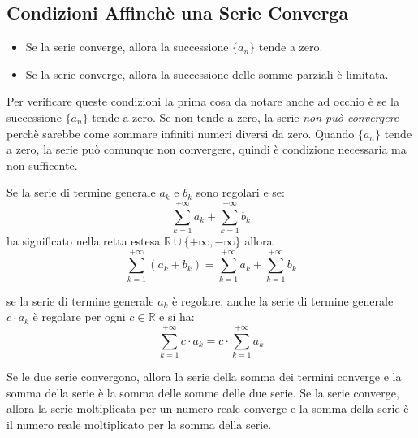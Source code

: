     \subsection{Condizioni Affinchè una Serie Converga}
    \begin{itemize}
        \item Se la serie converge, allora la successione $\{a_n\}$ tende a zero.
        \item Se la serie converge, allora la successione delle somme parziali è limitata.
    \end{itemize}
    Per verificare queste condizioni la prima cosa da notare anche ad occhio è se la successione $\{a_n\}$ tende a zero. Se non tende a zero, la serie \emph{non può convergere} perchè sarebbe come sommare infiniti numeri diversi da zero.
    Quando $\{a_n\}$ tende a zero, la serie può comunque non convergere, quindi è condizione necessaria ma non sufficente. 
        \begin{approfondimento}
            Se la serie di termine generale $a_k$ e $b_k$ sono regolari e se:
                \begin{equation}
                    \sum_{k=1}^{+\infty} a_k + \sum_{k=1}^{+\infty} b_k 
                \end{equation}
            ha significato nella retta estesa $\mathbb{R} \cup \{+\infty, -\infty\}$ allora:
                \begin{equation}
                    \sum_{k=1}^{+\infty} (a_k + b_k) = \sum_{k=1}^{+\infty} a_k + \sum_{k=1}^{+\infty} b_k 
                \end{equation}
        \end{approfondimento}
        \begin{approfondimento}
            se la serie di termine generale $a_k$ è regolare, anche la serie di termine generale $c \cdot a_k$ è regolare per ogni $c \in \mathbb{R}$ e si ha:
                \begin{equation}
                    \sum_{k=1}^{+\infty} c \cdot a_k = c \cdot \sum_{k=1}^{+\infty} a_k
                \end{equation}
        \end{approfondimento}
    \begin{definizione}
        Se le due serie convergono, allora la serie della somma dei termini converge e la somma della serie è la somma delle somme delle due serie.
        Se la serie converge, allora la serie moltiplicata per un numero reale converge e la somma della serie è il numero reale moltiplicato per la somma della serie.
    \end{definizione}
        

